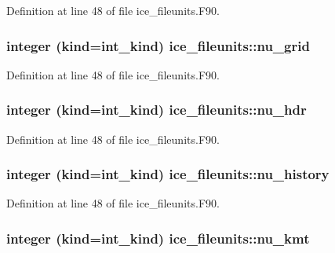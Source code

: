 Definition at line 48 of file ice\_\-fileunits.F90.\hypertarget{namespaceice__fileunits_a18ec8e581589b8dbeb70fbc61ae4a293}{
\subsubsection[{nu\_\-grid}]{\setlength{\rightskip}{0pt plus 5cm}integer (kind=int\_\-kind) {\bf ice\_\-fileunits::nu\_\-grid}}}
\label{namespaceice__fileunits_a18ec8e581589b8dbeb70fbc61ae4a293}


Definition at line 48 of file ice\_\-fileunits.F90.\hypertarget{namespaceice__fileunits_ad736df9f3244eeab32a92724cef14695}{
\subsubsection[{nu\_\-hdr}]{\setlength{\rightskip}{0pt plus 5cm}integer (kind=int\_\-kind) {\bf ice\_\-fileunits::nu\_\-hdr}}}
\label{namespaceice__fileunits_ad736df9f3244eeab32a92724cef14695}


Definition at line 48 of file ice\_\-fileunits.F90.\hypertarget{namespaceice__fileunits_a5ef8e946ea55345ba52282ad21ff1d91}{
\subsubsection[{nu\_\-history}]{\setlength{\rightskip}{0pt plus 5cm}integer (kind=int\_\-kind) {\bf ice\_\-fileunits::nu\_\-history}}}
\label{namespaceice__fileunits_a5ef8e946ea55345ba52282ad21ff1d91}


Definition at line 48 of file ice\_\-fileunits.F90.\hypertarget{namespaceice__fileunits_aaedfa4e4a189894dfedd14d7feabe219}{
\subsubsection[{nu\_\-kmt}]{\setlength{\rightskip}{0pt plus 5cm}integer (kind=int\_\-kind) {\bf ice\_\-fileunits::nu\_\-kmt}}}
\label{namespaceice__fileunits_aaedfa4e4a189894dfedd14d7feabe219}


